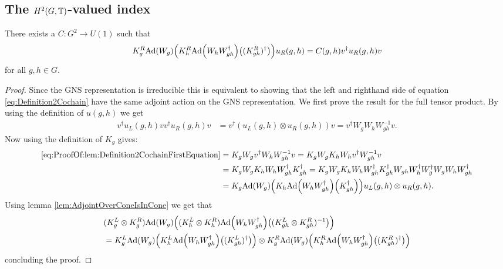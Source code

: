 \documentclass[11pt,a4paper,twoside]{article}
\numberwithin{equation}{section}
\begin{document}
	\subsection{The \texorpdfstring{$H^2(G,\mathbb T)$}{H2}-valued index}\label{sec:DefinitionH2Index}
	\begin{lemma}\label{lem:Definition2Cochain}
		There exists a $C:G^2\rightarrow U(1)$ such that 
		\begin{equation}\label{eq:Definition2Cochain}
			K_g^R\Ad{W_g}\left(K_h^R\Ad{W_hW_{gh}^\dagger}\left((K_{gh}^R)^\dagger\right)\right)u_
			R(g,h)=C(g,h)v^\dagger u_R(g,h)v
		\end{equation}
		for all $g,h\in G.$
	\end{lemma}
	\begin{proof}
		Since the GNS representation is irreducible this is equivalent to showing that the left and righthand side of equation \eqref{eq:Definition2Cochain} have the same adjoint action on the GNS representation. We first prove the result for the full tensor product. By using the definition of $u(g,h)$ we get
		\begin{align}\label{eq:ProofOf:lem:Definition2CochainFirstEquation}
			v^\dagger u_L(g,h)v v^\dagger u_R(g,h) v&=v^\dagger (u_L(g,h)\otimes u_R(g,h)) v =v^\dagger W_g W_h W_{gh}^{-1}v.
		\end{align}
		Now using the definition of $K_g$ gives:
		\begin{align}
			\eqref{eq:ProofOf:lem:Definition2CochainFirstEquation}&=K_gW_g v^\dagger W_h W_{gh}^{-1}v=K_gW_g K_h W_h v^\dagger W_{gh}^{-1}v\\
			\nonumber
			&=K_gW_g K_h W_h W_{gh}^\dagger K_{gh}^\dagger=K_gW_g K_h W_h W_{gh}^\dagger K_{gh}^\dagger W_{gh}W_h^\dagger W_g^\dagger W_gW_hW_{gh}^\dagger\\
			\nonumber
			&=K_g\Ad{W_g}\left(K_h\Ad{W_hW_{gh}^\dagger}\left(K_{gh}^\dagger\right)\right)u_L(g,h)\otimes u_
			R(g,h).
		\end{align}
		Using lemma \ref{lem:AdjointOverConeIsInCone} we get that
		\begin{align}
			&(K_g^L\otimes K_g^R)\Ad{W_g}\left((K_h^L\otimes K_h^R)\Ad{W_hW_{gh}^\dagger}\left((K_{gh}^L\otimes K_{gh}^R)^{-1}\right)\right)\\
			\nonumber
			&=K_g^L\Ad{W_g}\left(K_h^L\Ad{W_hW_{gh}^\dagger}\left((K_{gh}^L)^\dagger\right)\right)\otimes K_g^R\Ad{W_g}\left(K_h^R\Ad{W_hW_{gh}^\dagger}\left((K_{gh}^R)^\dagger\right)\right)
		\end{align}
		concluding the proof.
	\end{proof}
\end{document}
